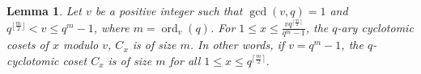 \documentclass[pdflatex,sn-mathphys-num]{sn-jnl}%
\newtheorem{lemma}{Lemma}
\theoremstyle{thmstyleone}%
\theoremstyle{thmstyletwo}%
\newtheorem{remark}{Remark}%
\theoremstyle{thmstylethree}%
\begin{document}
\begin{lemma}\textnormal{\cite[Lemma 8]{P-1}}\label{L3}
     Let $v$ be a positive integer such that $\operatorname{gcd}(v,q)=1$ and $q^{\lfloor\frac{m}{2}\rfloor}<v\leq q^m-1$, where $m=\operatorname{ord}_{v}(q)$. For $1\leq x\leq\frac{vq^{\lceil\frac{m}{2}\rceil}}{q^m-1}$, the $q$-ary cyclotomic cosets of $x$ modulo $v$, $C_{x}$ is of size $m$. In other words, if $v=q^m-1$, the $q$-cyclotomic coset $C_{x}$ is of size $m$ for all $1\leq x\leq q^{\lceil\frac{m}{2}\rceil}$.
\end{lemma}
\vspace{0.5em}
\end{document}
